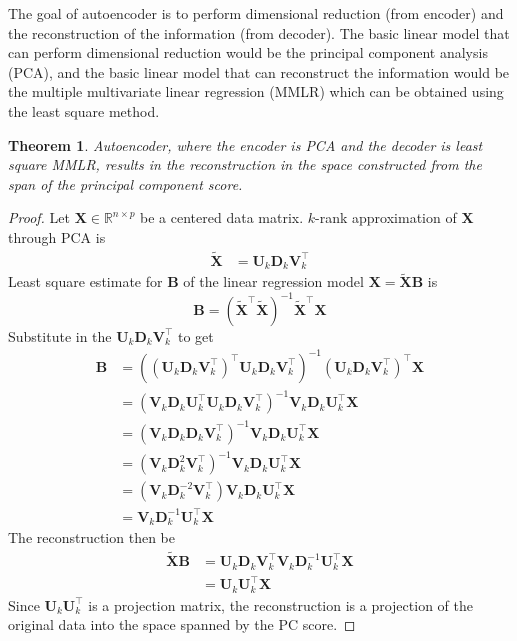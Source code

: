 \documentclass[12pt]{article}
\newtheorem{theorem}{Theorem}
\begin{document}
The goal of autoencoder is to perform dimensional reduction (from encoder) and the reconstruction of the information (from decoder). The basic linear model that can perform dimensional reduction would be the principal component analysis (PCA), and the basic linear model that can reconstruct the information would be the multiple multivariate linear regression (MMLR) which can be obtained using the least square method.
\begin{theorem}\label{thm:1}
Autoencoder, where the encoder is PCA and the decoder is least square MMLR, results in the reconstruction in the space constructed from the span of the principal component score.
\end{theorem}
\begin{proof}
    Let $\mathbf{X}\in \mathbb{R}^{n\times p}$ be a centered data matrix. $k$-rank approximation of $\mathbf{X}$ through PCA is \begin{align*}
        \tilde{\mathbf{X}} &= \mathbf{U}_k \mathbf{D}_k \mathbf{V}^\top_k
    \end{align*}
Least square estimate for $\mathbf{B}$ of the linear regression model 
$\mathbf{X} = \tilde{\mathbf{X}}\mathbf{B}$
is $$\mathbf{B} = \left(\tilde{\mathbf{X}}^\top\tilde{\mathbf{X}}\right)^{-1}\tilde{\mathbf{X}}^\top \mathbf{X}$$ 
Substitute in the $\mathbf{U}_k \mathbf{D}_k \mathbf{V}^\top_k$ to get
\begin{align*}
    \mathbf{B} &=\left((\mathbf{U}_k \mathbf{D}_k \mathbf{V}^\top_k)^\top \mathbf{U}_k \mathbf{D}_k \mathbf{V}^\top_k\right)^{-1} (\mathbf{U}_k \mathbf{D}_k \mathbf{V}^\top_k)^\top \mathbf{X}\\
    &= \left(\mathbf{V}_k \mathbf{D}_k \mathbf{U}^\top_k\mathbf{U}_k \mathbf{D}_k \mathbf{V}^\top_k\right)^{-1}\mathbf{V}_k \mathbf{D}_k \mathbf{U}^\top_k\mathbf{X}\\
    &= \left(\mathbf{V}_k \mathbf{D}_k\mathbf{D}_k \mathbf{V}^\top_k\right)^{-1}\mathbf{V}_k \mathbf{D}_k \mathbf{U}^\top_k\mathbf{X}\\
    &= \left(\mathbf{V}_k \mathbf{D}^2_k \mathbf{V}^\top_k\right)^{-1}\mathbf{V}_k \mathbf{D}_k \mathbf{U}^\top_k\mathbf{X}\\
    &= \left(\mathbf{V}_k \mathbf{D}^{-2}_k \mathbf{V}^\top_k\right)\mathbf{V}_k \mathbf{D}_k \mathbf{U}^\top_k\mathbf{X}\\
    &= \mathbf{V}_k \mathbf{D}_k^{-1}\mathbf{U}^\top_k \mathbf{X}
\end{align*}
The reconstruction then be 
\begin{align*}
    \tilde{\mathbf{X}}\mathbf{B} &= \mathbf{U}_k \mathbf{D}_k \mathbf{V}^\top_k\mathbf{V}_k\mathbf{D}_k^{-1}\mathbf{U}^\top_k \mathbf{X}\\ 
    &= \mathbf{U}_k\mathbf{U}_k^\top \mathbf{X}
\end{align*}
Since $\mathbf{U}_k\mathbf{U}_k^\top$ is a projection matrix, the reconstruction is a projection of the original data into the space spanned by the PC score.
\end{proof}
\end{document}
